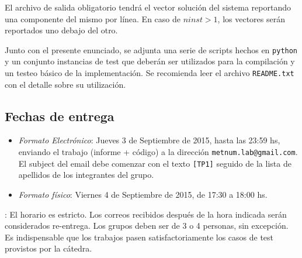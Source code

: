 \begin{appendices}
      El archivo de salida obligatorio tendrá el vector solución del sistema reportando una componente del mismo por línea. En caso de $ninst > 1$, los vectores serán reportados uno debajo del otro.

      Junto con el presente enunciado, se adjunta una serie de scripts hechos en \texttt{python} y un conjunto instancias de test que deberán ser utilizados para la compilación y un testeo básico de la implementación. Se recomienda leer el archivo \texttt{README.txt} con el detalle sobre su utilización.

    \subsection{Fechas de entrega}
      \begin{itemize}
        \item \emph{Formato Electrónico}: Jueves 3 de Septiembre de 2015, hasta las 23:59 hs, enviando el trabajo (informe + código) a la dirección \texttt{metnum.lab@gmail.com}. El subject del email debe comenzar con el texto \texttt{[TP1]} seguido de la lista de apellidos de los integrantes del grupo.
        \item \emph{Formato físico}: Viernes 4 de Septiembre de 2015, de 17:30 a 18:00 hs.
      \end{itemize}

      : El horario es estricto. Los correos recibidos después de la hora indicada serán considerados re-entrega. Los grupos deben ser de 3 o 4 personas, sin excepción. Es indispensable que los trabajos pasen satisfactoriamente los casos de test provistos por la cátedra.

\end{appendices}
